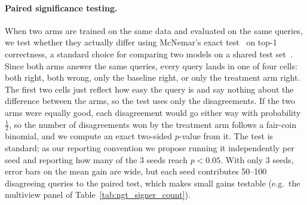 \paragraph{Paired significance testing.} When two arms are trained on the
same data and evaluated on the same queries, we test whether they actually
differ using McNemar's exact test~\cite{mcnemar1947note} on top-1
correctness, a standard choice for comparing two models on a shared test
set~\cite{dietterich1998approximate}. Since both arms answer the same
queries, every query lands in one of four cells: both right, both wrong,
only the baseline right, or only the treatment arm right. The first two
cells just reflect how easy the query is and say nothing about the
difference between the arms, so the test uses only the disagreements. If
the two arms were equally good, each disagreement would go either way with
probability $\tfrac{1}{2}$, so the number of disagreements won by the
treatment arm follows a fair-coin binomial, and we compute an exact
two-sided $p$-value from it. The test is standard; as our reporting
convention we propose running it independently per seed and reporting
how many of the 3 seeds reach $p<0.05$. With only 3 seeds, error bars on
the mean gain are wide, but each seed contributes 50--100 disagreeing
queries to the paired test, which makes small gains testable (e.g.\ the
multiview panel of Table~\ref{tab:ngt_signer_count}).
